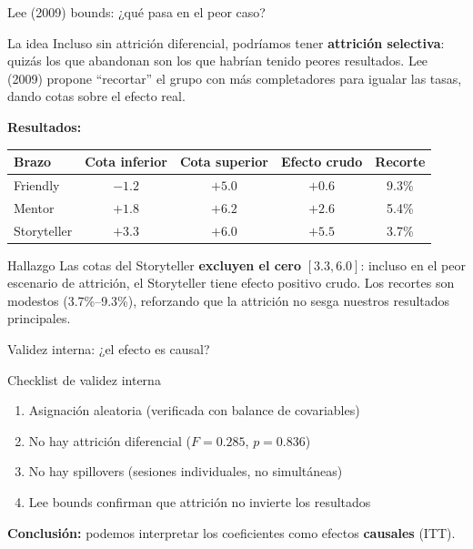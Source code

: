 \documentclass[aspectratio=169, 11pt]{beamer}
\begin{document}
\begin{frame}{Lee (2009) bounds: ¿qué pasa en el peor caso?}
\begin{block}{La idea}
\small
Incluso sin attrición diferencial, podríamos tener \textbf{attrición selectiva}: quizás los que abandonan son los que habrían tenido peores resultados. Lee (2009) propone ``recortar'' el grupo con más completadores para igualar las tasas, dando cotas sobre el efecto real.
\end{block}

\vspace{0.2cm}
\textbf{Resultados:}
\begin{center}
\small
\begin{tabular}{l c c c c}
\toprule
Brazo & Cota inferior & Cota superior & Efecto crudo & Recorte \\
\midrule
Friendly    & $-1.2$ & $+5.0$ & $+0.6$ & 9.3\% \\
Mentor      & $+1.8$ & $+6.2$ & $+2.6$ & 5.4\% \\
Storyteller & $+3.3$ & $+6.0$ & $+5.5$ & 3.7\% \\
\bottomrule
\end{tabular}
\end{center}

\vspace{0.1cm}
\begin{alertblock}{Hallazgo}
\small
Las cotas del Storyteller \textbf{excluyen el cero} $[3.3, 6.0]$: incluso en el peor escenario de attrición, el Storyteller tiene efecto positivo crudo. Los recortes son modestos (3.7\%--9.3\%), reforzando que la attrición no sesga nuestros resultados principales.
\end{alertblock}
\end{frame}

\begin{frame}{Validez interna: ¿el efecto es causal?}
\begin{block}{Checklist de validez interna}
\begin{enumerate}\setlength{\itemsep}{3pt}
  \item Asignación aleatoria \checkmark{} (verificada con balance de covariables)
  \item No hay attrición diferencial \checkmark{} ($F = 0.285$, $p = 0.836$)
  \item No hay spillovers \checkmark{} (sesiones individuales, no simultáneas)
  \item Lee bounds confirman que attrición no invierte los resultados \checkmark
\end{enumerate}
\end{block}

\vspace{0.3cm}
\textbf{Conclusión:} podemos interpretar los coeficientes como efectos \textbf{causales} (ITT).
\end{frame}
\end{document}

